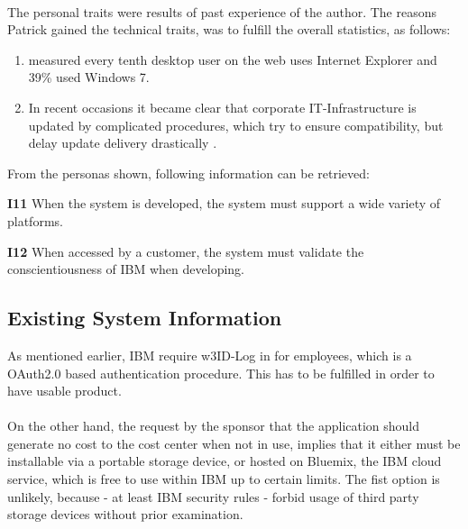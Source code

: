 \paragraph{}
The personal traits were results of past experience of the author. The reasons Patrick gained the technical traits, was to fulfill the overall statistics, as follows:
\begin{enumerate}
    \item \textcite{StatCounter.2017} measured every tenth desktop user on the web uses Internet Explorer and 39\% used Windows 7. 
    \item In recent occasions it became clear that corporate IT-Infrastructure is updated by complicated procedures, which try to ensure compatibility, but delay update delivery drastically \parencites{Gierow.2017}{Zivadinovic.13.05.2017}.
\end{enumerate}

From the personas shown, following information can be retrieved:

\begin{closeItem}
    \item [\textbf{I11}] When the system is developed, the system must support a wide variety of platforms.
    \item [\textbf{I12}] When accessed by a customer, the system must validate the conscientiousness of IBM when developing.
\end{closeItem}

\subsection{Existing System Information}
As mentioned earlier, IBM require w3ID-Log in for employees, which is a OAuth2.0 \parencite[cf.][]{InternetEngineeringTaskForce.2012} based authentication procedure. This has to be fulfilled in order to have  usable product. 

\paragraph{} On the other hand, the request by the sponsor that the application should generate no cost to the cost center when not in use, implies that it either must be installable via a portable storage device, or hosted on Bluemix, the IBM cloud service, which is free to use within IBM up to certain limits. The fist option is unlikely, because - at least IBM security rules - forbid usage of third party storage devices without prior examination.

